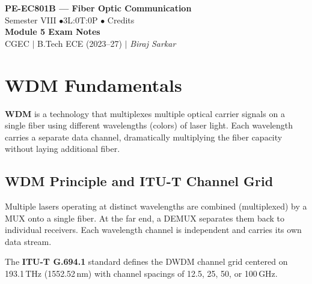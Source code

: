 \documentclass[12pt,a4paper]{article}
\begin{document}
\begin{center}
  {\LARGE\bfseries\color{myred} PE-EC801B --- Fiber Optic Communication}\\[5pt]
  {\normalsize\color{mydark} Semester VIII \quad$\bullet$\quad 3L:0T:0P \quad$\bullet$ Credits}\\[3pt]
  {\normalsize\color{myteal}\textbf{Module 5 Exam Notes}}\\[3pt]
  {\small\color{mydark} CGEC \;$|$\; B.Tech ECE (2023--27) \;$|$\; \textit{Biraj Sarkar}}
\end{center}
\vspace{2pt}
\noindent{\color{myred}\rule{\linewidth}{1.5pt}}
\vspace{2pt}

\hypersetup{linkcolor=mydark}
\tableofcontents
\hypersetup{linkcolor=myteal}
\newpage

\section{WDM Fundamentals}

\begin{tcolorbox}[defbox, title={\textbf{Wavelength Division Multiplexing (WDM)}}]
\textbf{WDM} is a technology that multiplexes multiple optical carrier signals on a single fiber using different wavelengths (colors) of laser light. Each wavelength carries a separate data channel, dramatically multiplying the fiber capacity without laying additional fiber.
\end{tcolorbox}

\subsection{WDM Principle and ITU-T Channel Grid}
Multiple lasers operating at distinct wavelengths are combined (multiplexed) by a MUX onto a single fiber. At the far end, a DEMUX separates them back to individual receivers. Each wavelength channel is independent and carries its own data stream.

The \textbf{ITU-T G.694.1} standard defines the DWDM channel grid centered on 193.1\,THz (1552.52\,nm) with channel spacings of 12.5, 25, 50, or 100\,GHz.
\end{document}
